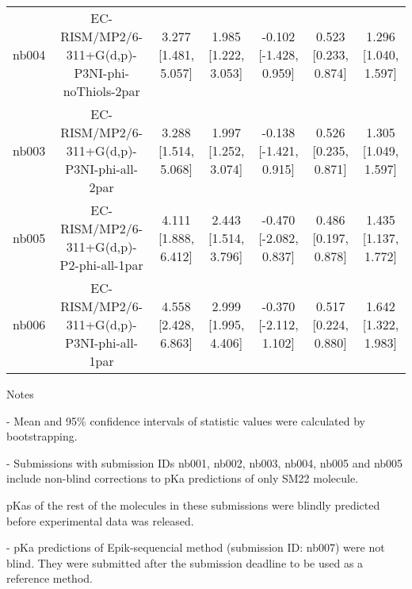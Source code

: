 \documentclass{article}
\begin{document}
\begin{center}
\begin{longtable}{|ccccccc|}
 nb004 &    EC-RISM/MP2/6-311+G(d,p)-P3NI-phi-noThiols-2par &  3.277 [1.481, 5.057] &  1.985 [1.222, 3.053] &   -0.102 [-1.428, 0.959] &  0.523 [0.233, 0.874] &   1.296 [1.040, 1.597] \\
 nb003 &         EC-RISM/MP2/6-311+G(d,p)-P3NI-phi-all-2par &  3.288 [1.514, 5.068] &  1.997 [1.252, 3.074] &   -0.138 [-1.421, 0.915] &  0.526 [0.235, 0.871] &   1.305 [1.049, 1.597] \\
 nb005 &           EC-RISM/MP2/6-311+G(d,p)-P2-phi-all-1par &  4.111 [1.888, 6.412] &  2.443 [1.514, 3.796] &   -0.470 [-2.082, 0.837] &  0.486 [0.197, 0.878] &   1.435 [1.137, 1.772] \\
 nb006 &         EC-RISM/MP2/6-311+G(d,p)-P3NI-phi-all-1par &  4.558 [2.428, 6.863] &  2.999 [1.995, 4.406] &   -0.370 [-2.112, 1.102] &  0.517 [0.224, 0.880] &   1.642 [1.322, 1.983] \\
\end{longtable}
\end{center}

Notes

- Mean and 95\% confidence intervals of statistic values were calculated by bootstrapping.

- Submissions with submission IDs nb001, nb002, nb003, nb004, nb005 and nb005 include non-blind corrections to pKa predictions of only SM22 molecule.

pKas of the rest of the molecules in these submissions were blindly predicted before experimental data was released.

- pKa predictions of Epik-sequencial method (submission ID: nb007) were not blind. They were submitted after the submission deadline to be used as a reference method.
\end{document}
